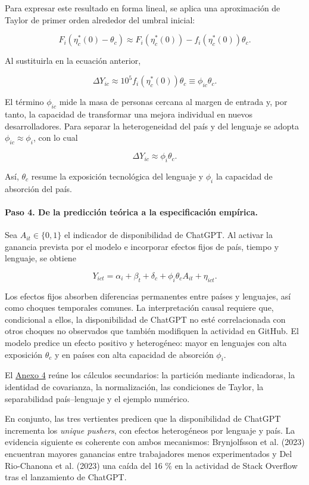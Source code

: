 \documentclass[12pt,a4paper]{article}
\begin{document}
Para expresar este resultado en forma lineal, se aplica una aproximación de Taylor de primer orden alrededor del umbral inicial:

\[
F_i(\eta_c^*(0)-\theta_c)\approx F_i(\eta_c^*(0))-f_i(\eta_c^*(0))\theta_c.
\]

Al sustituirla en la ecuación anterior,

\[
\Delta Y_{ic}\approx 10^5 f_i(\eta_c^*(0))\theta_c\equiv\phi_{ic}\theta_c.
\]

El término $\phi_{ic}$ mide la masa de personas cercana al margen de entrada y, por tanto, la capacidad de transformar una mejora individual en nuevos desarrolladores. Para separar la heterogeneidad del país y del lenguaje se adopta $\phi_{ic}\approx\phi_i$, con lo cual

\[
\Delta Y_{ic}\approx\phi_i\theta_c.
\]

Así, $\theta_c$ resume la exposición tecnológica del lenguaje y $\phi_i$ la capacidad de absorción del país.

\paragraph{Paso 4. De la predicción teórica a la especificación empírica.} Sea $A_{it}\in\{0,1\}$ el indicador de disponibilidad de ChatGPT. Al activar la ganancia prevista por el modelo e incorporar efectos fijos de país, tiempo y lenguaje, se obtiene

\[
Y_{ict}=\alpha_i+\beta_t+\delta_c+\phi_i\theta_c A_{it}+\eta_{ict}.
\]

Los efectos fijos absorben diferencias permanentes entre países y lenguajes, así como choques temporales comunes. La interpretación causal requiere que, condicional a ellos, la disponibilidad de ChatGPT no esté correlacionada con otros choques no observados que también modifiquen la actividad en GitHub. El modelo predice un efecto positivo y heterogéneo: mayor en lenguajes con alta exposición $\theta_c$ y en países con alta capacidad de absorción $\phi_i$.

El \hyperref[anexo:4]{Anexo 4} reúne los cálculos secundarios: la partición mediante indicadoras, la identidad de covarianza, la normalización, las condiciones de Taylor, la separabilidad país--lenguaje y el ejemplo numérico.

En conjunto, las tres vertientes predicen que la disponibilidad de ChatGPT incrementa los \textit{unique pushers}, con efectos heterogéneos por lenguaje y país. La evidencia siguiente es coherente con ambos mecanismos: Brynjolfsson et al. (2023) encuentran mayores ganancias entre trabajadores menos experimentados y Del Rio-Chanona et al. (2023) una caída del 16 \% en la actividad de Stack Overflow tras el lanzamiento de ChatGPT.
\end{document}

